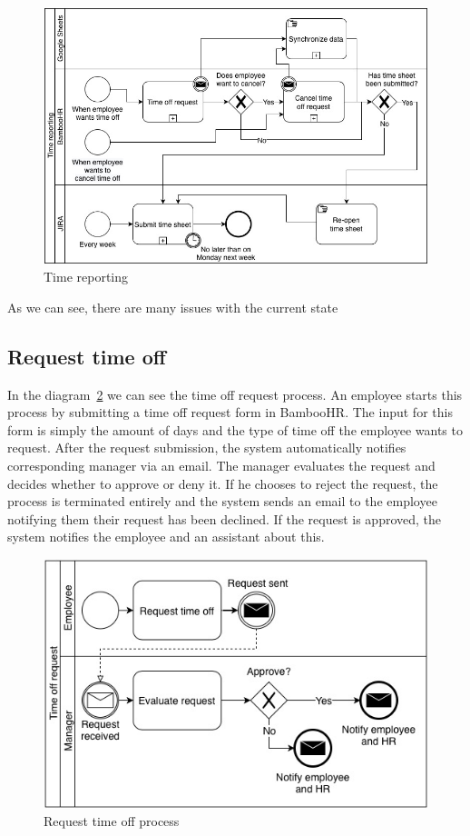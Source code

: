 \documentclass[12pt,oneside]{fithesis2}
\begin{document}
\begin{figure}[H]
    \centering
    \includegraphics[width=\textwidth]{images/time_reporting.jpg}
    \caption{Time reporting}
    \label{fig:time_reporting}
\end{figure}

As we can see, there are many issues with the current state

\subsection*{Request time off}
In the diagram~\ref{fig:time_off_request} we can see the time off request process. An employee starts this process by submitting a time off request form in BambooHR. The input for this form is simply the amount of days and the type of time off the employee wants to request. After the request submission, the system automatically notifies corresponding manager via an email. The manager evaluates the request and decides whether to approve or deny it. If he chooses to reject the request, the process is terminated entirely and the system sends an email to the employee notifying them their request has been declined. If the request is approved, the system notifies the employee and an assistant about this.

\begin{figure}[H]
    \centering
    \includegraphics[width=\textwidth]{images/time_off_request.jpg}
    \caption{Request time off process}
    \label{fig:time_off_request}
\end{figure}
\end{document}
